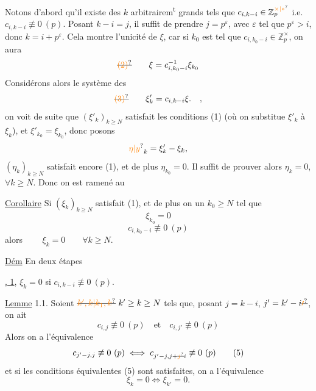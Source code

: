 Notons d'abord qu'il existe des $k$ arbitrairem\textsuperscript{t} grands tels que $c_{i,k-i}\in\mathbb Z_p^{\unsure{\times|*}}$ i.e. $c_{i,k-i}\not\equiv0\ (p)$. Posant $k-i=j$, il suffit de prendre $j=p^\varepsilon$, avec $\varepsilon$ tel que $p^\varepsilon>i$, donc $k=i+p^\varepsilon$. Cela montre l'unicité de $\xi$, car si $k_0$ est tel que $c_{i,k_0-i}\in\mathbb Z_p^\times$, on aura
\[
\deleted{\unsure{(2)}}\qquad \xi=c_{i,k_0-i}^{-1}\xi_{k_0}
\]
Considérons alors le système des
\[
\deleted{\unsure{(3)}}\qquad \xi'_k=c_{i,k-i}\xi.\quad,
\]
on voit de suite que  $(\xi'_k)_{k\geq N}$ satisfait  les conditions (1)\unsure{,|{}} (où on substitue $\xi'_k$ à $\xi_k$), et $\xi'_{k_0}=\xi_{k_0}$, donc posons
\[
\unsure{\eta|y}_k=\xi'_k-\xi_k,
\]
 $(\eta_k)_{k\geq N}$ satisfait encore (1), et de plus $\eta_{k_0}=0$. Il suffit de prouver alors $\eta_k=0$,  $\forall k\geq N$. Donc on est ramené au

\uline{Corollaire} Si $(\xi_k)_{k\geq N}$  satisfait (1), et  de plus  on  un $k_0\geq N$ tel que
\[
\xi_{k_0}=0\tag*{$(1')$}
\]
\[
c_{i,k_0-i}\not\equiv0\ (p)\tag*{(3)}
\]
alors $\qquad \xi_k=0\qquad\forall k\geq N$.

\uline{Dém} En deux étapes

\uline{, 1}, $\xi_k=0$ si  $c_{i,k-i}\not\equiv0\ (p)$.

\uline{Lemme} 1.1. Soient $\deleted{\unsure{k',k|k_1,k}}\ k'\geq k\geq N$ tels que, posant $j=k-i$, $j'=k'-i\deleted{\unsure{\prime}}$, on ait
\[
c_{i,j}\not\equiv0\ (p)\quad\text{et}\quad c_{i,j'}\not\equiv0\ (p)\tag*{(4)}
\]
Alors on a l'équivalence
\[
c_{j'-j,j}\not\equiv0\ (p)\iff c_{j'-j,j+\deleted{\unsure{j}}i}\not\equiv0\ (p)\tag*{(5)}
\]
et si les conditions équivalentes (5) sont satisfaites, on a l'équivalence
\[
\xi_k=0\iff\xi_{k'}=0.\tag*{(6)}
\]

